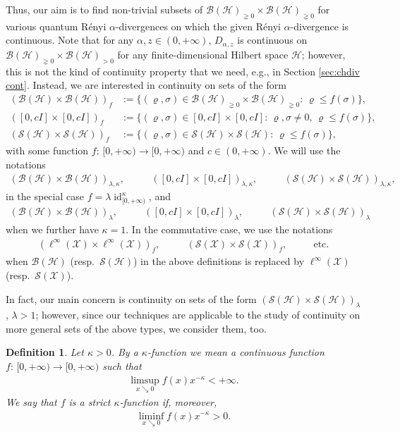 \documentclass[unsortedaddress,superscriptaddress,pra,notitlepage]{revtex4}
\newtheorem{definition}{Definition}[section]
\def\B{{\mathcal B}}
\def\S{{\mathcal S}}
\def\X{{\mathcal X}}
\def\rho{\varrho}
\def\hil{{\mathcal H}}
\def\bz{\left(}
\def\jz{\right)}
\def\pne{_{\gneq 0}}
\def\pp{_{>0}}
\def\pwr{\kappa}
\newcommand{\ki}[1]{\textit{\textit{#1}}}
\newcommand{\ds}{\mbox{ }\mbox{ }}
\DeclareMathOperator{\id}{id}
\begin{document}
Thus, our aim is to find non-trivial subsets of $\B(\hil)\pne\times\B(\hil)\pne$ for
various quantum R\'enyi $\alpha$-divergences on which the given R\'enyi $\alpha$-divergence is continuous. 
Note that for any $\alpha,z\in(0,+\infty)$, $D_{\alpha,z}$ is continuous on $\B(\hil)\pne\times\B(\hil)\pp$ for any 
finite-dimensional Hilbert space $\hil$;
however, this is not the kind of continuity property that we need, e.g., in 
Section \ref{sec:chdiv cont}.
Instead, we are interested in continuity on sets of the form 
\begin{align}
\bz\B(\hil)\times\B(\hil)\jz_{f}&:=\{(\rho,\sigma)\in\B(\hil)\pne
\times\B(\hil)\pne:\,\rho\le f(\sigma)\},\label{B f}\\
\bz[0,cI]\times[0,cI]\jz_{f}&:=\{(\rho,\sigma)\in[0,cI]\times[0,cI]:\,
\rho,\sigma\ne 0,\,\rho\le
f(\sigma)\},\label{B f2}\\
\bz\S(\hil)\times\S(\hil)\jz_{f}&:=\{(\rho,\sigma)\in\S(\hil)
\times\S(\hil):\,\rho\le f(\sigma)\},
\label{B f3}
\end{align}
with some function $f:\,[0,+\infty)\to[0,+\infty)$ and $c\in(0,+\infty)$. 
We will use the notations
\begin{align}
\bz\B(\hil)\times\B(\hil)\jz_{\lambda,\pwr},\ds\ds
\bz[0,cI]\times[0,cI]\jz_{\lambda,\pwr},\ds\ds
\bz\S(\hil)\times\S(\hil)\jz_{\lambda,\pwr},\ds\ds
\end{align}
in the special case $f=\lambda\id_{[0,+\infty)}^{\pwr}$, and
\begin{align*}
\bz\B(\hil)\times\B(\hil)\jz_{\lambda},\ds\ds
\bz[0,cI]\times[0,cI]\jz_{\lambda},\ds\ds
\bz\S(\hil)\times\S(\hil)\jz_{\lambda}
\end{align*}
when we further have $\pwr=1$. In the commutative case, we use the notations
\begin{align*}
(\ell^{\infty}(\X)\times\ell^{\infty}(\X))_{f},\ds\ds
(\S(\X)\times\S(\X))_{f},\ds\ds\text{etc.}
\end{align*}
when $\B(\hil)$ (resp.~$\S(\hil)$) in the above definitions is replaced by 
$\ell^{\infty}(\X)$ (resp.~$\S(\X)$). 

In fact, our main concern is continuity on sets of the form 
$\bz\S(\hil)\times\S(\hil)\jz_{\lambda}$, $\lambda>1$; however, since our techniques 
are applicable to the study of continuity on more general sets of the above types,
we consider them, too.

\begin{definition}\label{def:pwr-function}
Let $\pwr>0$. 
By a \ki{$\pwr$-function} we mean a continuous function 
$f:\,[0,+\infty)\to[0,+\infty)$ such that 
\begin{align*}
\limsup_{x\searrow 0}f(x)x^{-\pwr}<+\infty.
\end{align*}
We say that $f$ is a \ki{strict $\pwr$-function} if, moreover, 
\begin{align*}
\liminf_{x\searrow 0}f(x)x^{-\pwr}>0.
\end{align*}
\end{definition}
\end{document}
